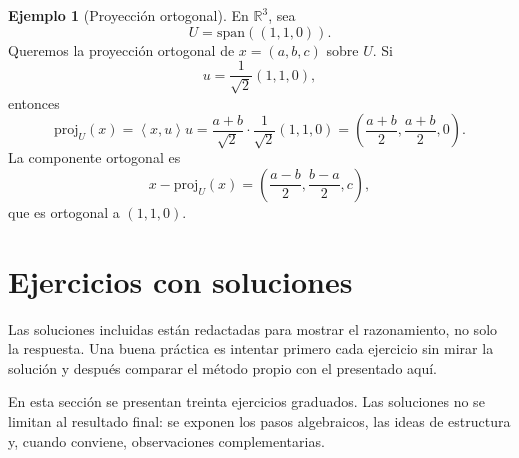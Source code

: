 \documentclass[10pt,a4paper,oneside]{article}
\theoremstyle{plain}
\theoremstyle{definition}
\newtheorem{example}[theorem]{Ejemplo}
\theoremstyle{remark}
\newcommand{\R}{\mathbb{R}}
\newcommand{\Span}{\mathrm{span}}
\newcommand{\angles}[1]{\left\langle #1 \right\rangle}
\begin{document}
\begin{example}[Proyección ortogonal]
En \(\R^3\), sea
\[
U=\Span((1,1,0)).
\]
Queremos la proyección ortogonal de \(x=(a,b,c)\) sobre \(U\). Si
\[
u=\frac{1}{\sqrt2}(1,1,0),
\]
entonces
\[
\mathrm{proj}_U(x)=\angles{x,u}u=
\frac{a+b}{\sqrt2}\cdot \frac{1}{\sqrt2}(1,1,0)
=\left(\frac{a+b}{2},\frac{a+b}{2},0\right).
\]
La componente ortogonal es
\[
x-\mathrm{proj}_U(x)=\left(\frac{a-b}{2},\frac{b-a}{2},c\right),
\]
que es ortogonal a \((1,1,0)\).
\end{example}



\section{Ejercicios con soluciones}
\begin{summaryBox}
Las soluciones incluidas están redactadas para mostrar el razonamiento, no solo la respuesta. Una buena práctica es intentar primero cada ejercicio sin mirar la solución y después comparar el método propio con el presentado aquí.
\end{summaryBox}
En esta sección se presentan treinta ejercicios graduados. Las soluciones no se limitan al resultado final: se exponen los pasos algebraicos, las ideas de estructura y, cuando conviene, observaciones complementarias.
\end{document}
